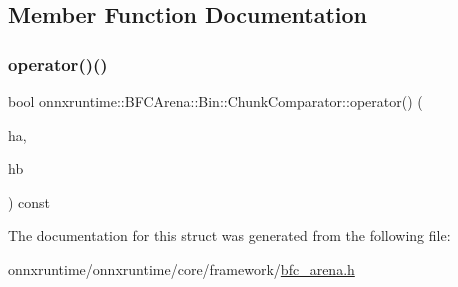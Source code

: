 \subsection{Member Function Documentation}
\mbox{\label{structonnxruntime_1_1BFCArena_1_1Bin_1_1ChunkComparator_a7200d54983c024e6b14811807e8e259b}} 
\subsubsection{\texorpdfstring{operator()()}{operator()()}}
{\footnotesize\ttfamily bool onnxruntime\+::\+B\+F\+C\+Arena\+::\+Bin\+::\+Chunk\+Comparator\+::operator() (\begin{DoxyParamCaption}\item[{const Chunk\+Handle}]{ha,  }\item[{const Chunk\+Handle}]{hb }\end{DoxyParamCaption}) const\hspace{0.3cm}{\ttfamily [inline]}}



The documentation for this struct was generated from the following file\+:\begin{DoxyCompactItemize}
\item 
onnxruntime/onnxruntime/core/framework/\mbox{\hyperlink{bfc__arena_8h}{bfc\+\_\+arena.\+h}}\end{DoxyCompactItemize}

